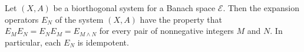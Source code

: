 Let $(X, A)$ be a biorthogonal system for a Banach space $\mathcal{E}$. Then the expansion operators $E_N$ of the system $(X, A)$ have the property that $E_M E_N = E_N E_M = E_{M \wedge N}$ for every pair of nonnegative integers $M$ and $N$. In particular, each $E_N$ is idempotent.
